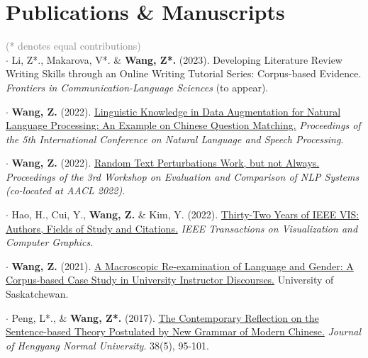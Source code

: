 \documentclass[letterpaper,11pt]{article}
\newcommand{\resumeSubHeadingListStart}{\begin{itemize}[leftmargin=0.15in, label={}]}
\newcommand{\resumeSubHeadingListEnd}{\end{itemize}}
\begin{document}

\section{Publications \& Manuscripts}

  \resumeSubHeadingListStart
    \small{\item{
    \textcolor{gray}{(* denotes equal contributions)} \\ \vspace{2pt}
        $\cdot$ Li, Z*., Makarova, V*. \& \textbf{Wang, Z*.} (2023). Developing Literature Review Writing Skills through an Online Writing Tutorial Series: Corpus-based Evidence. \emph{Frontiers in Communication-Language Sciences} (to appear). \\ \vspace{2pt}

        $\cdot$ \textbf{Wang, Z.} (2022). \href{https://aclanthology.org/2022.icnlsp-1.5/}{Linguistic Knowledge in Data Augmentation for Natural Language Processing: An Example on Chinese Question Matching.} \emph{Proceedings of the 5th International Conference on Natural Language and Speech Processing}. \\ \vspace{2pt}
        
        $\cdot$ \textbf{Wang, Z.} (2022). \href{https://aclanthology.org/2022.eval4nlp-1.6/}{Random Text Perturbations Work, but not Always.}  \emph{Proceedings of the 3rd Workshop on Evaluation and Comparison of NLP Systems (co-located at AACL 2022)}. \\ \vspace{2pt}
        
        $\cdot$ Hao, H., Cui, Y., \textbf{Wang, Z.} \& Kim, Y. (2022). \href{https://ieeexplore.ieee.org/abstract/document/9903512}{Thirty-Two Years of IEEE VIS: Authors, Fields of Study and Citations.} \emph{IEEE Transactions on Visualization and Computer Graphics}.  \\ \vspace{2pt}
        
        $\cdot$ \textbf{Wang, Z.} (2021). \href{https://harvest.usask.ca/handle/10388/13387}{A Macroscopic Re-examination of Language and Gender: A Corpus-based Case Study in University Instructor Discourses.} University of Saskatchewan. \\ \vspace{2pt}
        
        $\cdot$ Peng, L*., \& \textbf{Wang, Z*.} (2017). \href{https://www.researchgate.net/publication/340730935_The_contemporary_reflection_on_the_Sentence-Based_theory_postulated_by_New_Grammar_of_Modern_Chinese}{The Contemporary Reflection on the Sentence-based Theory Postulated by New Grammar of Modern Chinese.} \emph{Journal of Hengyang Normal University}. 38(5), 95-101.
    }} \\ \vspace{-5pt}
  \resumeSubHeadingListEnd
  
\end{document}

